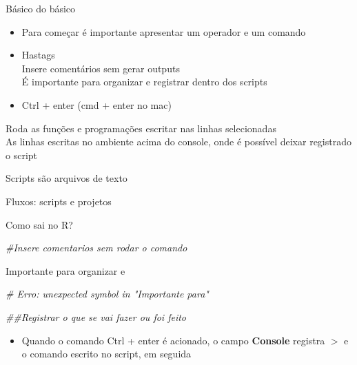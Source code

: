 \documentclass[
  10pt,
  ignorenonframetext,
]{beamer}
\newenvironment{Shaded}{\begin{snugshade}}{\end{snugshade}}
\newcommand{\CommentTok}[1]{\textcolor[rgb]{0.56,0.35,0.01}{\textit{#1}}}
\newcommand{\NormalTok}[1]{#1}
\providecommand{\tightlist}{%
  \setlength{\itemsep}{0pt}\setlength{\parskip}{0pt}}
\begin{document}
\begin{frame}{Básico do básico}
\protect\hypertarget{buxe1sico-do-buxe1sico}{}
\begin{itemize}
\item
  Para começar é importante apresentar um operador e um comando
\item
  Hastags\\
  Insere comentários sem gerar outputs\\
  É importante para organizar e registrar dentro dos scripts
\item
  Ctrl + enter (cmd + enter no mac)
\end{itemize}

Roda as funções e programações escritar nas linhas selecionadas\\
As linhas escritas no ambiente acima do console, onde é possível deixar
registrado o script

Scripts são arquivos de texto

Fluxos: scripts e projetos
\end{frame}

\begin{frame}[fragile]{Como sai no R?}
\protect\hypertarget{como-sai-no-r}{}
\begin{Shaded}
\begin{Highlighting}[]
\CommentTok{\#Insere comentarios sem rodar o comando}

\NormalTok{Importante para organizar e}

\CommentTok{\# Erro: unexpected symbol in "Importante para"}

\CommentTok{\#\#Registrar o que se vai fazer ou foi feito}
\end{Highlighting}
\end{Shaded}

\begin{itemize}
\tightlist
\item
  Quando o comando Ctrl + enter é acionado, o campo \textbf{Console}
  registra \(>\) e o comando escrito no script, em seguida
\end{itemize}
\end{frame}
\end{document}
